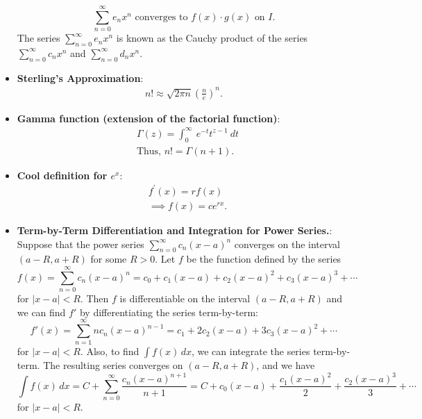 \documentclass{report}
\begin{document}
\begin{itemize}
\[                    \sum_{n=0}^{\infty} e_n x^n \text{ converges to } f(x) \cdot g(x) \text{ on } I.
                \]
                The series \(\sum_{n=0}^{\infty} e_n x^n\) is known as the Cauchy product of the series \(\sum_{n=0}^{\infty} c_n x^n\) and \(\sum_{n=0}^{\infty} d_n x^n\).
            \item \textbf{Sterling's Approximation}:
                \begin{align*}
                    n! \approx \sqrt{2\pi n}\left(\frac{n}{e}\right)^{n}
                .\end{align*}
            \item \textbf{Gamma function (extension of the factorial function)}:
                \begin{align*}
                     &\Gamma(z) = \int_{0}^{\infty}\ e^{-t}t^{z-1}\ dt \\
                     &\text{Thus, } n! = \Gamma(n+1)
                 .\end{align*}
             \item \textbf{Cool definition for $e^{x}$}:
                 \begin{align*}
                    &f^{\prime}(x) = rf(x) \\
                    &\implies f(x) = ce^{rx}
                .\end{align*}
            \item \textbf{Term-by-Term Differentiation and Integration for Power Series.}:
                Suppose that the power series $\sum_{n=0}^{\infty} c_n (x - a)^n$ converges on the interval $(a - R, a + R)$ for some $R > 0$. Let $f$ be the function defined by the series
                \[
                    f(x) = \sum_{n=0}^{\infty} c_n (x - a)^n = c_0 + c_1(x - a) + c_2(x - a)^2 + c_3(x - a)^3 + \cdots
                \]
                for $|x - a| < R$. Then $f$ is differentiable on the interval $(a - R, a + R)$ and we can find $f'$ by differentiating the series term-by-term:
                \[
                    f'(x) = \sum_{n=1}^{\infty} n c_n (x - a)^{n-1} = c_1 + 2c_2(x - a) + 3c_3(x - a)^2 + \cdots
                \]
                for $|x - a| < R$. Also, to find $\int f(x) \, dx$, we can integrate the series term-by-term. The resulting series converges on $(a - R, a + R)$, and we have
                \[
                    \int f(x) \, dx = C + \sum_{n=0}^{\infty} \frac{c_n (x - a)^{n+1}}{n+1} = C + c_0(x - a) + \frac{c_1(x - a)^2}{2} + \frac{c_2(x - a)^3}{3} + \cdots
                \]
                for $|x - a| < R$.

\end{itemize}
\end{document}
